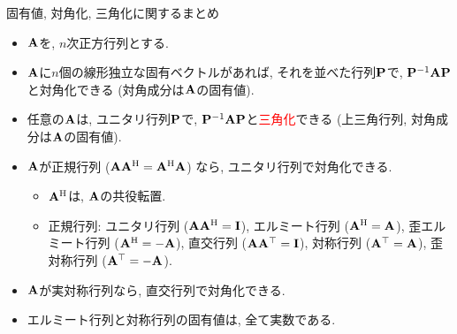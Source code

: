 \documentclass[dvipdfmx,notheorems,t]{beamer}
\begin{document}
\begin{frame}{固有値, 対角化, 三角化に関するまとめ}
\begin{itemize}
  \item $\vb{A}$を, $n$次正方行列とする.
  \item $\vb{A}$に$n$個の線形独立な固有ベクトルがあれば, それを並べた行列$\vb{P}$で,
  $\vb{P}^{-1} \vb{A} \vb{P}$と対角化できる (対角成分は$\vb{A}$の固有値).
  \item 任意の$\vb{A}$は, ユニタリ行列$\vb{P}$で, $\vb{P}^{-1} \vb{A} \vb{P}$と\textcolor{red}{三角化}できる
  (上三角行列, 対角成分は$\vb{A}$の固有値).
  \item $\vb{A}$が正規行列 ($\vb{A} \vb{A}^\mathrm{H} = \vb{A}^\mathrm{H} \vb{A}$) なら,
  ユニタリ行列で対角化できる.
  \begin{itemize}
    \item $\vb{A}^\mathrm{H}$は, $\vb{A}$の共役転置.
    \item 正規行列: ユニタリ行列 ($\vb{A} \vb{A}^\mathrm{H} = \vb{I}$),
    エルミート行列 ($\vb{A}^\mathrm{H} = \vb{A}$), 歪エルミート行列 ($\vb{A}^\mathrm{H} = -\vb{A}$),
    直交行列 ($\vb{A} \vb{A}^\top = \vb{I}$), 対称行列 ($\vb{A}^\top = \vb{A}$), 歪対称行列 ($\vb{A}^\top = -\vb{A}$).
  \end{itemize}
  \item $\vb{A}$が実対称行列なら, 直交行列で対角化できる.
  \item エルミート行列と対称行列の固有値は, 全て実数である.
\end{itemize}
\end{frame}

\end{document}
